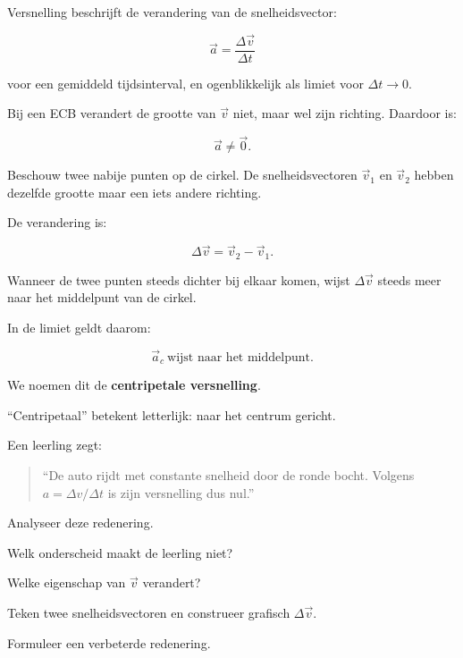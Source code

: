\documentclass{ximera}
\begin{document}


Versnelling beschrijft de verandering van de snelheidsvector:

\[
\vec a
=
\frac{\Delta\vec v}{\Delta t}
\]

voor een gemiddeld tijdsinterval, en ogenblikkelijk als limiet voor
$\Delta t\to0$.

Bij een ECB verandert de grootte van $\vec v$ niet, maar wel zijn
richting. Daardoor is:

\[
\boxed{\vec a\neq\vec 0}.
\]



Beschouw twee nabije punten op de cirkel. De snelheidsvectoren
$\vec v_1$ en $\vec v_2$ hebben dezelfde grootte maar een iets andere
richting.

De verandering is:

\[
\Delta\vec v
=
\vec v_2-\vec v_1.
\]

Wanneer de twee punten steeds dichter bij elkaar komen, wijst
$\Delta\vec v$ steeds meer naar het middelpunt van de cirkel.

In de limiet geldt daarom:

\[
\boxed{
\vec a_c\ \text{wijst naar het middelpunt}.
}
\]

We noemen dit de \textbf{centripetale versnelling}.

``Centripetaal'' betekent letterlijk: naar het centrum gericht.


\begin{oefening}{\oefU\ESS}

Een leerling zegt:

\begin{quote}
``De auto rijdt met constante snelheid door de ronde bocht. Volgens
$a=\Delta v/\Delta t$ is zijn versnelling dus nul.''
\end{quote}

Analyseer deze redenering.

\begin{question}
Welk onderscheid maakt de leerling niet?
\end{question}

\begin{question}
Welke eigenschap van $\vec v$ verandert?
\end{question}

\begin{question}
Teken twee snelheidsvectoren en construeer grafisch
$\Delta\vec v$.
\end{question}

\begin{question}
Formuleer een verbeterde redenering.
\end{question}

\end{oefening}
\end{document}

